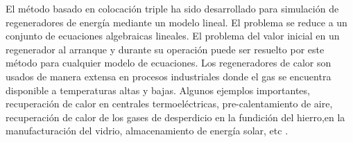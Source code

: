 \documentclass[12pt,letterpaper,final]{article}%
\begin{document}
El método basado en colocación triple ha sido desarrollado para simulación de regeneradores de energía mediante un modelo lineal. El problema se reduce a un conjunto de ecuaciones algebraicas lineales. El problema del valor inicial en un regenerador al arranque y durante su operación puede ser resuelto por este método para cualquier modelo de ecuaciones. 
\newline
Los regeneradores de calor son usados de manera extensa en procesos industriales donde el gas se encuentra disponible a temperaturas altas y bajas. Algunos ejemplos importantes, recuperación de calor en centrales termoeléctricas, pre-calentamiento de aire, recuperación de calor de los gases de desperdicio en la fundición del hierro,en la manufacturación del vidrio, almacenamiento de energía solar, etc \cite{Ramachadran1984}.
\newline
\end{document}
